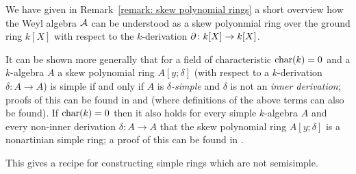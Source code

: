 \begin{remark}
  We have given in Remark~\ref{remark: skew polynomial rings} a short overview how the Weyl algebra $\operatorname{\mathcal{A}}$ can be understood as a skew polyonmial ring over the ground ring $k[X]$ with respect to the $k$-derivation $\partial \colon k[X] \to k[X]$.
  
  It can be shown more generally that for a field of characteristic $\operatorname{char}(k) = 0$ and a $k$-algebra $A$ a skew polynomial ring $A[y;\delta]$ (with respect to a $k$-derivation $\delta \colon A \to A$) is simple if and only if $A$ is \emph{$\delta$-simple} and $\delta$ is not an \emph{inner derivation};
  proofs of this can be found in \cite[Theorem~3.15]{Lam1991First} and \cite[Proposition~2.1]{NoncommutativeNoetherian} (where definitions of the above terms can also be found).
  If $\operatorname{char}(k) = 0$ then it also holds for every simple $k$-algebra $A$ and every non-inner derivation $\delta \colon A \to A$ that the skew polynomial ring $A[y;\delta]$ is a nonartinian simple ring; a proof of this can be found in \cite[Corollary~3.16]{Lam1991First}.
  
  This gives a recipe for constructing simple rings which are not semisimple.
\end{remark}



